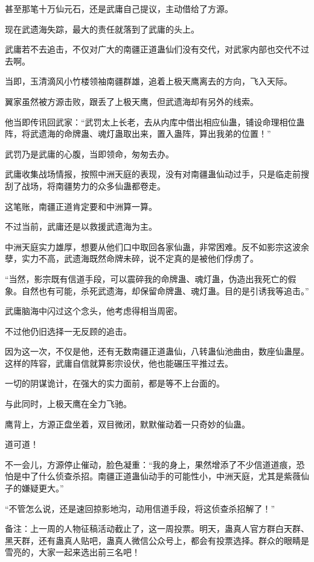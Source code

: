 \begin{this_body}
甚至那笔十万仙元石，还是武庸自己提议，主动借给了方源。

现在武遗海失踪，最大的责任就落到了武庸的头上。

武庸若不去追击，不仅对广大的南疆正道蛊仙们没有交代，对武家内部也交代不过去啊。

当即，玉清滴风小竹楼领袖南疆群雄，追着上极天鹰离去的方向，飞入天际。

翼家虽然被方源击败，跟丢了上极天鹰，但武遗海却有另外的线索。

他当即传讯回武家：“武罚太上长老，去从内库中借出相应仙蛊，铺设命理相位蛊阵，将武遗海的命牌蛊、魂灯蛊取出来，置入蛊阵，算出我弟的位置！”

武罚乃是武庸的心腹，当即领命，匆匆去办。

武庸收集战场情报，按照中洲天庭的表现，没有对南疆蛊仙动过手，只是临走前搜刮了战场，将南疆势力的众多仙蛊都卷走。

这笔账，南疆正道肯定要和中洲算一算。

不过当前，武庸还是以救援武遗海为主。

中洲天庭实力雄厚，想要从他们口中取回各家仙蛊，非常困难。反不如影宗这波余孽，实力不高，武遗海既然命牌未碎，说不定真的是被他们俘虏了。

“当然，影宗既有信道手段，可以震碎我的命牌蛊、魂灯蛊，伪造出我死亡的假象。自然也有可能，杀死武遗海，却保留命牌蛊、魂灯蛊。目的是引诱我等追击。”

武庸脑海中闪过这个念头，他考虑得相当周密。

不过他仍旧选择一无反顾的追击。

因为这一次，不仅是他，还有无数南疆正道蛊仙，八转蛊仙池曲由，数座仙蛊屋。这样的阵容，武庸自信就算影宗设伏，他也能碾压平推过去。

一切的阴谋诡计，在强大的实力面前，都是等不上台面的。

与此同时，上极天鹰在全力飞驰。

鹰背上，方源正盘坐着，双目微闭，默默催动着一只奇妙的仙蛊。

道可道！

不一会儿，方源停止催动，脸色凝重：“我的身上，果然增添了不少信道道痕，恐怕是中了什么侦查杀招。南疆正道蛊仙动手的可能性小，中洲天庭，尤其是紫薇仙子的嫌疑更大。”

“不管怎么说，还是速回掠影地沟，动用信道手段，将这侦查杀招解了！”

备注：上一周的人物征稿活动截止了，这一周投票。明天，蛊真人官方群白天群、黑天群，还有蛊真人贴吧，蛊真人微信公众号上，都会有投票选择。群众的眼睛是雪亮的，大家一起来选出前三名吧！

\end{this_body}


